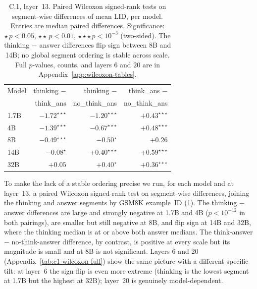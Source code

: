 \documentclass{article}
\theoremstyle{plain}
\theoremstyle{definition}
\theoremstyle{remark}
\begin{document}
\begin{table}[t]
    \centering
    \footnotesize
    \begin{tabular}{lrrr}
    \toprule
    Model & thinking $-$ & thinking $-$ & think\_ans $-$ \\
          & think\_ans   & no\_think\_ans & no\_think\_ans \\
    \midrule
    1.7B & $-1.72^{\star\star\star}$ & $-1.20^{\star\star\star}$ & $+0.43^{\star\star\star}$ \\
    4B   & $-1.39^{\star\star\star}$ & $-0.67^{\star\star\star}$ & $+0.48^{\star\star\star}$ \\
    8B   & $-0.49^{\star\star\star}$ & $-0.50^{\star}$           & $+0.26$ \\
    14B  & $-0.08^{\star}$           & $+0.40^{\star\star\star}$ & $+0.59^{\star\star\star}$ \\
    32B  & $+0.05$                   & $+0.40^{\star}$           & $+0.36^{\star\star\star}$ \\
    \bottomrule
    \end{tabular}
    \caption{C.1, layer~13. Paired Wilcoxon signed-rank tests on segment-wise differences of mean LID, per model. Entries are median paired differences. Significance: $\star\,p<0.05$, $\star\star\,p<0.01$, $\star\star\star\,p<10^{-3}$ (two-sided). The thinking $-$ answer differences {flip sign} between 8B and 14B; no global segment ordering is stable across scale. Full $p$-values, counts, and layers $6$ and $20$ are in Appendix~\ref{app:wilcoxon-tables}.}
    \label{tab:c1-wilcoxon-layer13}
\end{table}

To make the lack of a stable ordering precise we run, for each model and at layer~13, a paired Wilcoxon signed-rank test on segment-wise differences, joining the thinking and answer segments by GSM8K example~ID (\cref{tab:c1-wilcoxon-layer13}). The thinking $-$ answer differences are large and strongly negative at 1.7B and 4B ($p\!<\!10^{-12}$ in both pairings), are smaller but still negative at 8B, and {flip sign} at 14B and 32B, where the thinking median is at or above both answer medians. The think-answer $-$ no-think-answer difference, by contrast, is positive at every scale but its magnitude is small and at 8B is not significant. Layers $6$ and $20$ (Appendix~\cref{tab:c1-wilcoxon-full}) show the same picture with a different specific tilt: at layer~6 the sign flip is even more extreme (thinking is the lowest segment at 1.7B but the highest at 32B); layer~20 is genuinely model-dependent.
\end{document}
